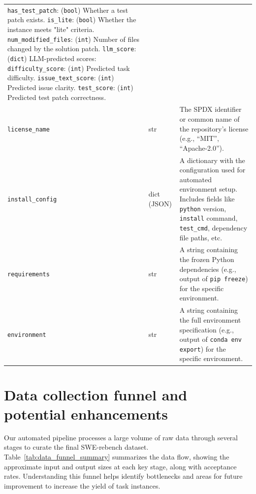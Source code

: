 \documentclass[dandb]{article}
\begin{document}
\begin{table}[htbp]
\begin{tabularx}{\textwidth}{@{}llX@{}}
        \quad \texttt{has\_test\_patch}: (\texttt{bool}) Whether a test patch exists. \newline
        \quad \texttt{is\_lite}: (\texttt{bool}) Whether the instance meets "lite" criteria. \newline
        \quad \texttt{num\_modified\_files}: (\texttt{int}) Number of files changed by the solution patch. \newline
        \quad \texttt{llm\_score}: (\texttt{dict}) LLM-predicted scores: \newline
        \quad \quad \texttt{difficulty\_score}: (\texttt{int}) Predicted task difficulty. \newline
        \quad \quad \texttt{issue\_text\_score}: (\texttt{int}) Predicted issue clarity. \newline
        \quad \quad \texttt{test\_score}: (\texttt{int}) Predicted test patch correctness. \\
    \texttt{license\_name} & str & The SPDX identifier or common name of the repository's license (e.g., ``MIT'', ``Apache-2.0''). \\
    \texttt{install\_config} & dict (JSON) & A dictionary with the configuration used for automated environment setup. Includes fields like \texttt{python} version, \texttt{install} command, \texttt{test\_cmd}, dependency file paths, etc. \\
    \texttt{requirements} & str & A string containing the frozen Python dependencies (e.g., output of \texttt{pip freeze}) for the specific environment. \\
    \texttt{environment} & str & A string containing the full environment specification (e.g., output of \texttt{conda env export}) for the specific environment. \\
    \bottomrule
  \end{tabularx}
\end{table}

\section{Data collection funnel and potential enhancements}
\label{appendix:data_funnel}

Our automated pipeline processes a large volume of raw data through several stages to curate the final SWE-rebench dataset. Table~\ref{tab:data_funnel_summary} summarizes the data flow, showing the approximate input and output sizes at each key stage, along with acceptance rates. Understanding this funnel helps identify bottlenecks and areas for future improvement to increase the yield of task instances.
\end{document}
